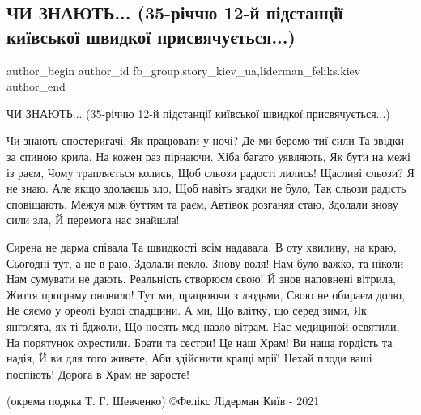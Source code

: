  
 
 
 
 
 
\subsection{ЧИ ЗНАЮТЬ... (35-річчю 12-й підстанції київської швидкої присвячується...)}
\label{sec:03_12_2021.fb.fb_group.story_kiev_ua.1.35_letie_skoraja}
 
\ifcmt
 author_begin
   author_id fb_group.story_kiev_ua,liderman_feliks.kiev
 author_end
\fi

ЧИ ЗНАЮТЬ... (35-річчю 12-й підстанції київської швидкої присвячується...)

\begin{multicols}{2} %
\setlength{\parindent}{0pt}
\obeycr
Чи знають спостеригачі, 
Як працювати у ночі?
Де ми беремо тиї сили
Та звідки за спиною крила, 
На кожен раз пірнаючи.
\smallskip
Хіба багато уявляють, 
Як бути на межі із раєм,
Чому трапляється колись, 
Щоб сльози радості лились! 
Щасливі сльози? Я не знаю. 
\smallskip
Але якщо здолаєшь зло, 
Щоб навіть згадки не було, 
Так сльози радість сповіщають.
Межуя між буттям та раєм, 
Автівок розганяя стаю, 
Здолали знову сили зла,
Й перемога нас знайшла!
\restorecr
\end{multicols} %


\begin{multicols}{2} %
\setlength{\parindent}{0pt}
\obeycr
Сирена не дарма співала
Та швидкості всім надавала. 
В оту хвилину, на краю, 
Сьогодні тут, а не в раю, 
Здолали пекло. Знову воля! 
\smallskip
Нам було важко, та ніколи 
Нам сумувати не дають. 
Реальність створюєм свою! 
Й знов наповнені вітрила, 
Життя програму оновило! 
\smallskip
Тут ми, працюючи з людьми, 
Свою не обираєм долю, 
Не сяємо у ореолі
Булої спадщини. А ми, 
Що влітку, що серед зими, 
Як янголята, як ті бджоли, 
Що носять мед назло вітрам. 
\smallskip
Нас медициной освятили, 
На порятунок охрестили. 
Брати та сестри! Це наш Храм!
\smallskip
Ви наша гордість та надія, 
Й ви для того живете, 
Аби здійснити кращі мрії! 
\smallskip
Нехай плоди ваші поспіють! 
Дорога в Храм не заросте! 
\restorecr
\end{multicols} %

(окрема подяка Т. Г. Шевченко) ©Фелікс Лідерман Київ - 2021
